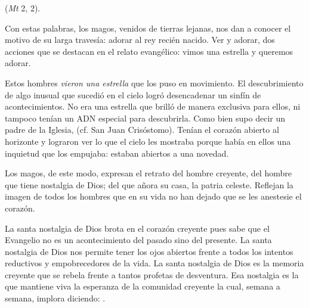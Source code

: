 				\begin{body}
						 (\emph{Mt} 2, 2).
					
					Con estas palabras, los magos, venidos de tierras lejanas, nos dan a conocer el motivo de su larga travesía: adorar al rey recién nacido. Ver y adorar, dos acciones que se destacan en el relato evangélico: vimos una estrella y queremos adorar.
					
					Estos hombres \emph{vieron una estrella} que los puso en movimiento. El descubrimiento de algo inusual que sucedió en el cielo logró desencadenar un sinfín de acontecimientos. No era una estrella que brilló de manera exclusiva para ellos, ni tampoco tenían un ADN especial para descubrirla. Como bien supo decir un padre de la Iglesia,  (cf. San Juan Crisóstomo). Tenían el corazón abierto al horizonte y lograron ver lo que el cielo les mostraba porque había en ellos una inquietud que los empujaba: estaban abiertos a una novedad.
					
					Los magos, de este modo, expresan el retrato del hombre creyente, del hombre que tiene nostalgia de Dios; del que añora su casa, la patria celeste. Reflejan la imagen de todos los hombres que en su vida no han dejado que se les anestesie el corazón.
					
					La santa nostalgia de Dios brota en el corazón creyente pues sabe que el Evangelio no es un acontecimiento del pasado sino del presente. La santa nostalgia de Dios nos permite tener los ojos abiertos frente a todos los intentos reductivos y empobrecedores de la vida. La santa nostalgia de Dios es la memoria creyente que se rebela frente a tantos profetas de desventura. Esa nostalgia es la que mantiene viva la esperanza de la comunidad creyente la cual, semana a semana, implora diciendo: .
					

\end{body}
